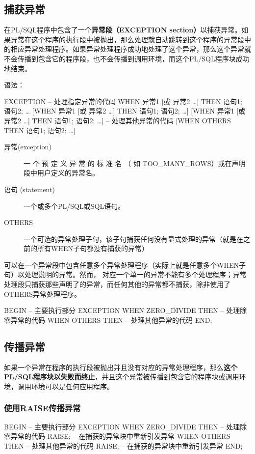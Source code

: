 \documentclass[11pt, a4paper, oneside, UTF8]{ctexbook}
\let\kaishu\relax %
\begin{document}
\subsection{捕获异常}
在PL/SQL程序中包含了一个{\bfseries\kaishu 异常段（EXCEPTION section）}以捕获异常。如果异常在这个程序的执行段中被抛出，那么处理就自动跳转到这个程序的异常段中的相应异常处理程序。如果异常处理程序成功地处理了这个异常，那么这个异常就不会传播到包含它的程序段，也不会传播到调用环境，而这个PL/SQL程序块成功地结束。

语法：
\begin{plsql}[caption=捕获异常语法]
EXCEPTION
  -- 处理指定异常的代码
  WHEN 异常1 [或 异常2 …] THEN
    语句1;
    语句2;
    …
  [WHEN 异常1 [或 异常2 …] THEN
    语句1;
    语句2;
  …]
  [WHEN 异常1 [或 异常2 …] THEN
    语句1;
    语句2;
  …]
  -- 处理其他异常的代码
  [WHEN OTHERS THEN
    语句1;
    语句2;
  …]
\end{plsql}

\begin{description}
  \item[异常(exception)] 一 个 预 定 义 异 常 的 标 准 名 （ 如  TOO\_MANY\_ROWS）或在声明段中用户定义的异常名。
  \item[语句 (statement)] 一个或多个PL/SQL或SQL语句。
  \item[OTHERS] 一个可选的异常处理子句，该子句捕获任何没有显式处理的异常（就是在之前的所有WHEN子句都没有捕获的异常）
\end{description}

可以在一个异常段中包含任意多个异常处理程序（实际上就是任意多个WHEN子句）以处理说明的异常。然而， 对应一个单一的异常不能有多个处理程序；异常处理段只捕获那些声明了的异常，而任何其他的异常都不捕获，除非使用了OTHERS异常处理程序。

\begin{plsql}[caption=捕获异常示例代码]
BEGIN
  -- 主要执行部分
EXCEPTION
  WHEN ZERO_DIVIDE THEN
  -- 处理除零异常的代码
  WHEN OTHERS THEN
  -- 处理其他异常的代码
END;
\end{plsql}

\subsection{传播异常}
如果一个异常在程序的执行段被抛出并且没有对应的异常处理程序，那么{\bfseries\kaishu 这个PL/SQL程序块以失败而终止}，并且这个异常被传播到包含它的程序块或调用环境，调用环境可以是任何应用程序。

\subsubsection{使用RAISE传播异常}
\begin{plsql}[caption=RAISE传播异常示例代码]
BEGIN
  -- 主要执行部分
EXCEPTION
  WHEN ZERO_DIVIDE THEN
  -- 处理除零异常的代码
  RAISE;    -- 在捕获的异常块中重新引发异常
  WHEN OTHERS THEN
  -- 处理其他异常的代码
  RAISE;    -- 在捕获的异常块中重新引发异常
END;
\end{plsql}
\end{document}
